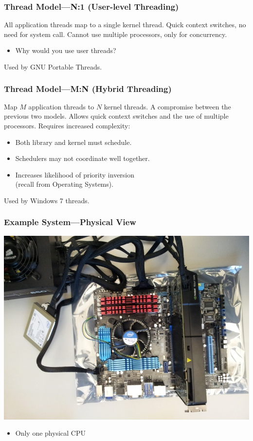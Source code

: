 \begin{frame}
  \frametitle{Thread Model---N:1 (User-level Threading)}

    All application threads map to a single kernel thread.
    \vfill
    Quick context switches, no need for system call.
    \vfill
    Cannot use multiple processors, only for concurrency.
      \begin{itemize}
        \item Why would you use user threads?
      \end{itemize}
    \vfill
    Used by GNU Portable Threads.
\end{frame}

\begin{frame}
  \frametitle{Thread Model---M:N (Hybrid Threading)}

    Map $M$ application threads to $N$ kernel threads.
    \vfill
    A compromise between the previous two models.
    \vfill
    Allows quick context switches and the use of multiple processors.
    \vfill
    Requires increased complexity:
    \begin{itemize}
        \item Both library and kernel must schedule.
        \item Schedulers may not coordinate well together.
        \item Increases likelihood of priority inversion\\ \hspace*{2em} (recall from Operating Systems).
      \end{itemize}
    \vfill
    Used by Windows 7 threads.
\end{frame}

\begin{frame}[fragile]
  \frametitle{Example System---Physical View}
  
  \begin{center}
  \includegraphics[scale=0.25]{images/computer-parts}
  \end{center}

  \begin{itemize}
    \item Only one physical CPU
  \end{itemize}
\end{frame}

